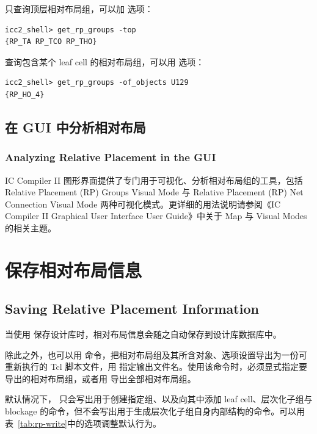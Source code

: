 只查询顶层相对布局组，可以加  选项：
\begin{lstlisting}
icc2_shell> get_rp_groups -top
{RP_TA RP_TCO RP_THO}
\end{lstlisting}

查询包含某个 leaf cell 的相对布局组，可以用  选项：
\begin{lstlisting}
icc2_shell> get_rp_groups -of_objects U129
{RP_HO_4}
\end{lstlisting}

\subsection{在 GUI 中分析相对布局}
\subsubsection*{Analyzing Relative Placement in the GUI}

IC Compiler II 图形界面提供了专门用于可视化、分析相对布局组的工具，包括 Relative Placement (RP) Groups Visual Mode 与 Relative Placement (RP) Net Connection Visual Mode 两种可视化模式。更详细的用法说明请参阅《IC Compiler II Graphical User Interface User Guide》中关于 Map 与 Visual Modes 的相关主题。

\section{保存相对布局信息}
\subsection*{Saving Relative Placement Information}

当使用  保存设计库时，相对布局信息会随之自动保存到设计库数据库中。

除此之外，也可以用  命令，把相对布局组及其所含对象、选项设置导出为一份可重新执行的 Tcl 脚本文件，用  指定输出文件名。使用该命令时，必须显式指定要导出的相对布局组，或者用  导出全部相对布局组。

默认情况下， 只会写出用于创建指定组、以及向其中添加 leaf cell、层次化子组与 blockage 的命令，但不会写出用于生成层次化子组自身内部结构的命令。可以用表~\ref{tab:rp-write}中的选项调整默认行为。

